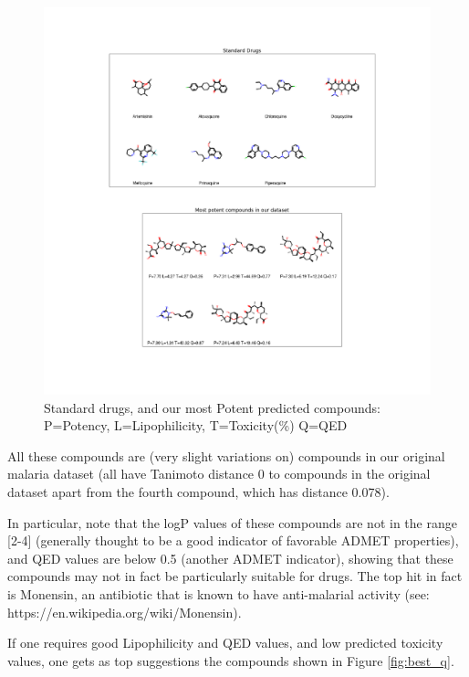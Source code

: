 \documentclass{article}
\begin{document}
\begin{figure}[h!]
\centering
\includegraphics[width=\textwidth]{fig6_drugs_n_pot.png}
\caption{Standard drugs, and our most Potent predicted compounds: P=Potency, L=Lipophilicity, T=Toxicity(\%) Q=QED}
\label{fig:mostpot}
\end{figure}


All these compounds are (very slight variations on) compounds in our original malaria dataset (all have Tanimoto distance 0 to compounds in the original dataset apart from the fourth compound, which has distance 0.078).  

In particular, note that the logP values of these compounds are not in the range [2-4] (generally thought to be a good indicator of favorable ADMET properties), and QED values are below 0.5 (another ADMET indicator), showing that these compounds may not in fact be particularly suitable for drugs.  The top hit in fact is Monensin, an antibiotic that is known to have anti-malarial activity (see: https://en.wikipedia.org/wiki/Monensin).

If one requires good Lipophilicity and QED values, and low predicted toxicity values, one gets as top suggestions the compounds shown in Figure \ref{fig:best_q}.
\end{document}
